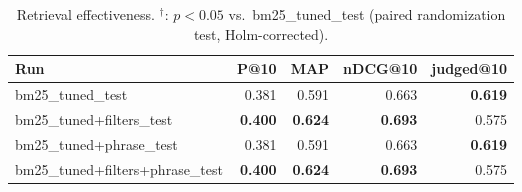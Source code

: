 \begin{table}[t]
\centering
\begin{tabular}{lrrrr}
\toprule
Run & P@10 & MAP & nDCG@10 & judged@10 \\
\midrule
bm25\_tuned\_test & 0.381 & 0.591 & 0.663 & \textbf{0.619} \\
bm25\_tuned+filters\_test & \textbf{0.400} & \textbf{0.624} & \textbf{0.693} & 0.575 \\
bm25\_tuned+phrase\_test & 0.381 & 0.591 & 0.663 & \textbf{0.619} \\
bm25\_tuned+filters+phrase\_test & \textbf{0.400} & \textbf{0.624} & \textbf{0.693} & 0.575 \\
\bottomrule
\end{tabular}
\caption{Retrieval effectiveness. $^\dagger$: $p<0.05$ vs.\ bm25\_tuned\_test (paired randomization test, Holm-corrected).}
\end{table}
